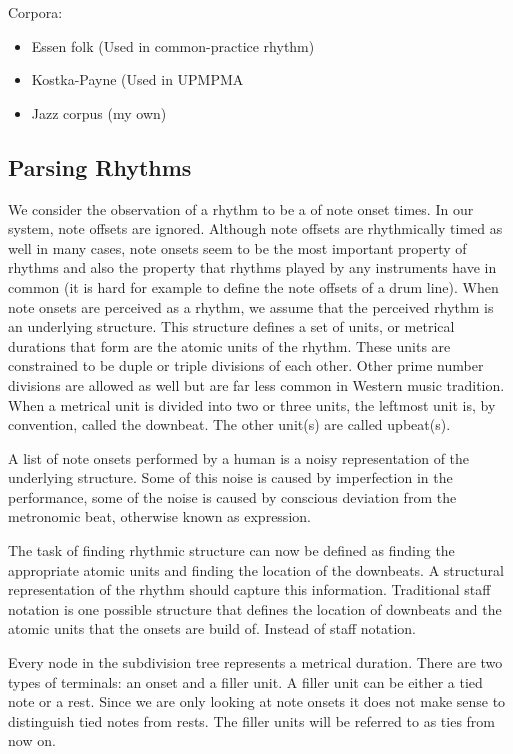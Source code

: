 Corpora:
\begin{itemize}
\item Essen folk (Used in common-practice rhythm)
\item Kostka-Payne (Used in UPMPMA
\item Jazz corpus (my own)
\end{itemize}


\subsection{Parsing Rhythms}

We consider the observation of a rhythm to be a of note onset times. In our system, note offsets are ignored. Although note offsets are rhythmically timed as well in many cases, note onsets seem to be the most important property of rhythms and also the property that rhythms played by any instruments have in common (it is hard for example to define the note offsets of a drum line). When note onsets are perceived as a rhythm, we assume that the perceived rhythm is an underlying structure. This structure defines a set of units, or metrical durations that form are the atomic units of the rhythm. These units are constrained to be duple or triple divisions of each other. Other prime number divisions are allowed as well but are far less common in Western music tradition. When a metrical unit is divided into two or three units, the leftmost unit is, by convention, called the downbeat. The other unit(s) are called upbeat(s).

A list of note onsets performed by a human is a noisy representation of the underlying structure. Some of this noise is caused by imperfection in the performance, some of the noise is caused by conscious deviation from the metronomic beat, otherwise known as expression.

The task of finding rhythmic structure can now be defined as finding the appropriate atomic units and finding the location of the downbeats. A structural representation of the rhythm should capture this information. Traditional staff notation is one possible structure that defines the location of downbeats and the atomic units that the onsets are build of. Instead of staff notation.

Every node in the subdivision tree represents a metrical duration. There are two types of terminals: an onset and a filler unit. A filler unit can be either a tied note or a rest. Since we are only looking at note onsets it does not make sense to distinguish tied notes from rests. The filler units will be referred to as ties from now on.

